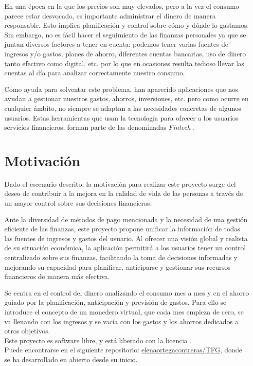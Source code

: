 En una época en la que los precios son muy elevados, pero a la vez el consumo parece estar desvocado, es importante administrar el dinero de manera responsable. Esto implica planificación y control sobre cómo y dónde lo gastamos.
Sin embargo, no es fácil hacer el seguimiento de las finanzas personales ya que se 
juntan diversos factores a tener en cuenta: podemos tener varias fuentes de ingresos y/o 
gastos, planes de ahorro, diferentes cuentas bancarias, uso de dinero tanto 
efectivo como digital, etc. por lo que en ocasiones resulta tedioso 
llevar las cuentas al día para analizar correctamente nuestro consumo.

Como ayuda para solventar este problema, han aparecido aplicaciones que nos ayudan a gestionar nuestros gastos, ahorros, inversiones, etc. pero como ocurre en cualquier ámbito, no siempre se adaptan a las necesidades concretas de algunos usuarios. Estas herramientas que usan la tecnología para ofrecer a los usuarios servicios financieros, forman parte de las denominadas \textit{Fintech} \cite{schueffel2016taming}.

\section{Motivación}
Dado el escenario descrito, la motivación para realizar este proyecto surge del deseo de contribuir a la mejora en la calidad de vida de las personas a través de un mayor control sobre sus decisiones financieras. 

Ante la diversidad de métodos de pago mencionada y la necesidad de una gestión eficiente de las finanzas, este proyecto propone unificar la información de todas las fuentes de ingresos y gastos del usuario. Al ofrecer una visión global y realista de su situación económica, la aplicación permitirá a los usuarios tener un control centralizado sobre sus finanzas, facilitando la toma de decisiones informadas y mejorando su capacidad para planificar, anticiparse y gestionar sus recursos financieros de manera más efectiva.

Se centra en el control del dinero analizando el consumo mes a mes y en el 
ahorro guiado por la planificación, anticipación y previsión de gastos. Para ello 
se introduce el concepto de un monedero virtual, que cada mes empieza de cero, se va 
llenando con los ingresos y se vacía con los gastos y los ahorros dedicados a otros objetivos.\\

Este proyecto es software libre, y está liberado con la licencia \cite{gplv3}.\\
Puede encontrarse en el siguiente repositorio:
\href{https://github.com/elenaortegacontreras/TFG}{elenaortegacontreras/TFG}, 
donde se ha desarrollado en abierto desde su inicio.

